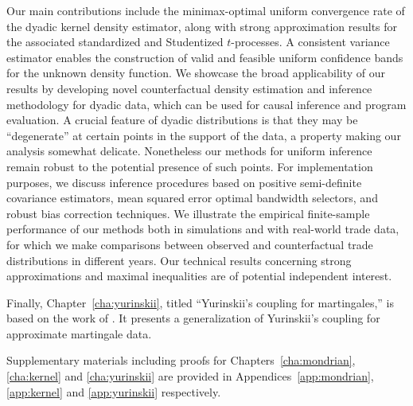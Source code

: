 Our main contributions include the minimax-optimal uniform convergence rate
of the dyadic kernel density estimator,
along with strong approximation results
for the associated standardized and Studentized $t$-processes.
A consistent variance estimator
enables the construction of valid and feasible uniform confidence bands for
the unknown density function.
We showcase the broad applicability of our results by
developing novel counterfactual density estimation
and inference methodology for dyadic data,
which can be used for causal inference and program evaluation.
%
A crucial feature of dyadic distributions
is that they may be ``degenerate'' at certain
points in the support of the data,
a property making our analysis somewhat delicate.
Nonetheless our methods for uniform inference
remain robust to the potential presence of such points.
%
For implementation purposes,
we discuss inference procedures based on
positive semi-definite covariance estimators,
mean squared error optimal bandwidth selectors,
and robust bias correction techniques.
We illustrate the empirical finite-sample performance of our
methods both in simulations and with real-world trade data,
for which we make comparisons between observed and counterfactual
trade distributions in different years.
Our technical results concerning strong approximations
and maximal inequalities are of potential independent interest.

Finally, Chapter~\ref{cha:yurinskii},
titled ``Yurinskii's coupling for martingales,''
is based on the work of \cite{cattaneo2022yurinskii}.
It presents a generalization of Yurinskii's coupling
for approximate martingale data.

Supplementary materials including proofs for
Chapters~\ref{cha:mondrian}, \ref{cha:kernel} and \ref{cha:yurinskii}
are provided in Appendices~\ref{app:mondrian}, \ref{app:kernel}
and \ref{app:yurinskii} respectively.

